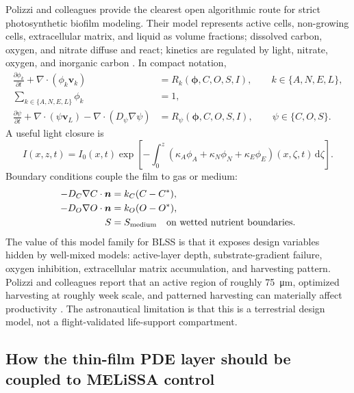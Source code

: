 \documentclass[11pt]{article}
\newcommand{\MEL}{MELiSSA}
\newcommand{\dd}{\mathrm{d}}
\begin{document}
Polizzi and colleagues provide the clearest open algorithmic route for strict photosynthetic biofilm modeling. Their model represents active cells, non-growing cells, extracellular matrix, and liquid as volume fractions; dissolved carbon, oxygen, and nitrate diffuse and react; kinetics are regulated by light, nitrate, oxygen, and inorganic carbon \parencite[1, 3--5]{polizzi2022}. In compact notation,
\begin{align}
  \frac{\partial \phi_k}{\partial t}+\nabla\cdot(\phi_k\bm v_k)&=R_k(\bm \phi,C,O,S,I),\qquad k\in\{A,N,E,L\},\label{eq:mixture_phi}\\
  \sum_{k\in\{A,N,E,L\}}\phi_k&=1,\label{eq:sum_phi}\\
  \frac{\partial \psi}{\partial t}+\nabla\cdot(\psi\bm v_L)-\nabla\cdot(D_\psi\nabla\psi)&=R_\psi(\bm \phi,C,O,S,I),\qquad \psi\in\{C,O,S\}.\label{eq:dissolved_pde}
\end{align}
A useful light closure is
\begin{equation}
  I(x,z,t)=I_0(x,t)\exp\left[-\int_0^z \left(\kappa_A\phi_A+\kappa_N\phi_N+\kappa_E\phi_E\right)(x,\zeta,t)\,\dd\zeta\right].
  \label{eq:2d_light}
\end{equation}
Boundary conditions couple the film to gas or medium:
\begin{align}
  -D_C\nabla C\cdot \bm n&=k_C(C-C^*),\label{eq:carbon_bc}\\
  -D_O\nabla O\cdot \bm n&=k_O(O-O^*),\label{eq:oxygen_bc}\\
  S&=S_{\rm medium}\quad \text{on wetted nutrient boundaries}.\label{eq:nitrate_bc}
\end{align}
The value of this model family for BLSS is that it exposes design variables hidden by well-mixed models: active-layer depth, substrate-gradient failure, oxygen inhibition, extracellular matrix accumulation, and harvesting pattern. Polizzi and colleagues report that an active region of roughly \SI{75}{\micro m}, optimized harvesting at roughly week scale, and patterned harvesting can materially affect productivity \parencite[1, 5, 15--16]{polizzi2022}. The astronautical limitation is that this is a terrestrial design model, not a flight-validated life-support compartment.

\subsection{How the thin-film PDE layer should be coupled to \MEL{} control}
\end{document}
